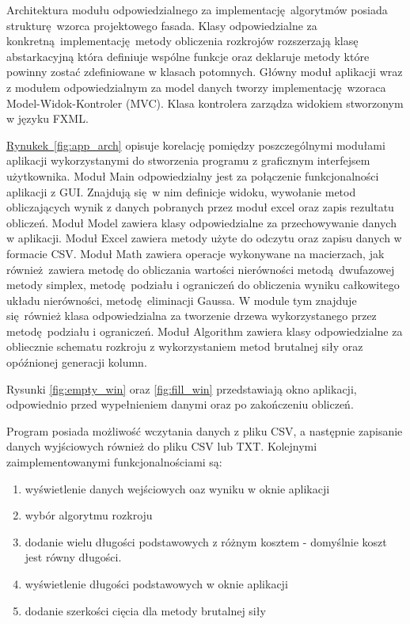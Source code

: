 Architektura modułu odpowiedzialnego za implementację algorytmów posiada strukturę wzorca projektowego fasada. Klasy odpowiedzialne za konkretną implementację metody obliczenia rozkrojów rozszerzają klasę abstarkacyjną która definiuje wspólne funkcje oraz deklaruje metody które powinny zostać zdefiniowane w klasach potomnych. Główny moduł aplikacji wraz z modułem odpowiedzialnym za model danych tworzy implementację wzoraca Model-Widok-Kontroler (MVC). Klasa kontrolera zarządza widokiem stworzonym w języku FXML.

\hyperref[fig:java_arch]{Rynukek~\ref*{fig:app_arch}} opisuje korelację pomiędzy poszczególnymi modułami aplikacji wykorzystanymi do stworzenia programu z graficznym interfejsem użytkownika. Moduł Main odpowiedzialny jest za połączenie funkcjonalności aplikacji z GUI. Znajdują się w nim definicje widoku, wywołanie metod obliczających wynik z danych pobranych przez moduł excel oraz zapis rezultatu obliczeń. Moduł Model zawiera klasy odpowiedzialne za przechowywanie danych w aplikacji. Moduł Excel zawiera metody użyte do odczytu oraz zapisu danych w formacie CSV. Moduł Math zawiera operacje wykonywane na macierzach, jak również zawiera metodę do obliczania wartości nierówności metodą dwufazowej metody simplex, metodę podziału i ograniczeń do obliczenia wyniku całkowitego układu nierówności, metodę eliminacji Gaussa. W module tym znajduje się również klasa odpowiedzialna za tworzenie drzewa wykorzystanego przez metodę podziału i ograniczeń. Moduł Algorithm zawiera klasy odpowiedzialne za obliecznie schematu rozkroju z wykorzystaniem metod brutalnej siły oraz opóźnionej generacji kolumn.

Rysunki \ref{fig:empty_win} oraz \ref{fig:fill_win} przedstawiają okno aplikacji, odpowiednio przed wypełnieniem danymi oraz po zakończeniu obliczeń.

Program posiada możliwość wczytania danych z pliku CSV, a następnie zapisanie danych wyjściowych również do pliku CSV lub TXT. Kolejnymi zaimplementowanymi funkcjonalnościami są:
\begin{enumerate}
  \item wyświetlenie danych wejściowych oaz wyniku w oknie aplikacji
  \item wybór algorytmu rozkroju
  \item dodanie wielu długości podstawowych z różnym kosztem - domyślnie koszt jest równy długości.
  \item wyświetlenie długości podstawowych w oknie aplikacji
  \item dodanie szerkości cięcia dla metody brutalnej siły
\end{enumerate}

